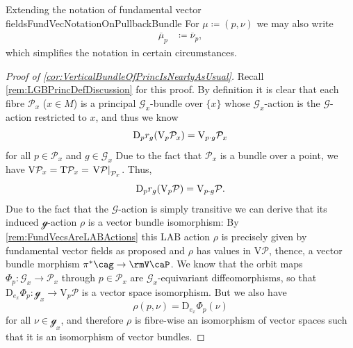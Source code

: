 \documentclass[reqno,a4paper,oneside]{amsart}
\theoremstyle{plain}
\theoremstyle{remark}
\theoremstyle{definition}
\begin{document}
\begin{remarks}{Extending the notation of fundamental vector fields}{FundVecNotationOnPullbackBundle}
For $\mu \coloneqq (p, \nu)$ we may also write
\begin{align*}
\overline{\mu}_p
&\coloneqq
\overline{\nu}_p,
\end{align*}
which simplifies the notation in certain circumstances.
\end{remarks}

\begin{proof}[Proof of \ref{cor:VerticalBundleOfPrincIsNearlyAsUsual}]
\leavevmode\newline
Recall \ref{rem:LGBPrincDefDiscussion} for this proof. By definition it is clear that each fibre $\mathcal{P}_x$ ($x \in M$) is a principal $\mathcal{G}_x$-bundle over $\{x\}$ whose $\mathcal{G}_x$-action is the $\mathcal{G}$-action restricted to $x$, and thus we know
\begin{equation*}
\mathrm{D}_pr_g\mleft(\mathrm{V}_p\mathcal{P}_x\mright)
=
\mathrm{V}_{p\cdot g} \mathcal{P}_x
\end{equation*}
for all $p \in \mathcal{P}_x$ and $g \in \mathcal{G}_x$
Due to the fact that $\mathcal{P}_x$ is a bundle over a point, we have $\mathrm{V}\mathcal{P}_x = \mathrm{T}\mathcal{P}_x = \mleft.\mathrm{V}\mathcal{P}\mright|_{\mathcal{P}_x}$. Thus,
\begin{equation*}
\mathrm{D}_pr_g\mleft(\mathrm{V}_p\mathcal{P}\mright)
=
\mathrm{V}_{p\cdot g} \mathcal{P}.
\end{equation*}
Due to the fact that the $\mathcal{G}$-action is simply transitive we can derive that its induced $\mathcal{g}$-action $\rho$ is a vector bundle isomorphism: By \ref{rem:FundVecsAreLABActions} this LAB action $\rho$ is precisely given by fundamental vector fields as proposed and $\rho$ has values in $\mathrm{V}\mathcal{P}$, thence, a vector bundle morphism $\pi^*\cag \to \rmV\caP$. We know that the orbit maps $\Phi_p\colon \mathcal{G}_x \to \mathcal{P}_x$ through $p \in \mathcal{P}_x$ are $\mathcal{G}_x$-equivariant diffeomorphisms, so that $\mathrm{D}_{e_x}\Phi_p\colon \mathcal{g}_x \to \mathrm{V}_p\mathcal{P}$ is a vector space isomorphism. But we also have
\begin{equation*}
\rho(p, \nu)
=
\mathrm{D}_{e_x}\Phi_p(\nu)
\end{equation*}
for all $\nu\in \mathcal{g}_x$, and therefore $\rho$ is fibre-wise an isomorphism of vector spaces such that it is an isomorphism of vector bundles.
\end{proof}
\end{document}
